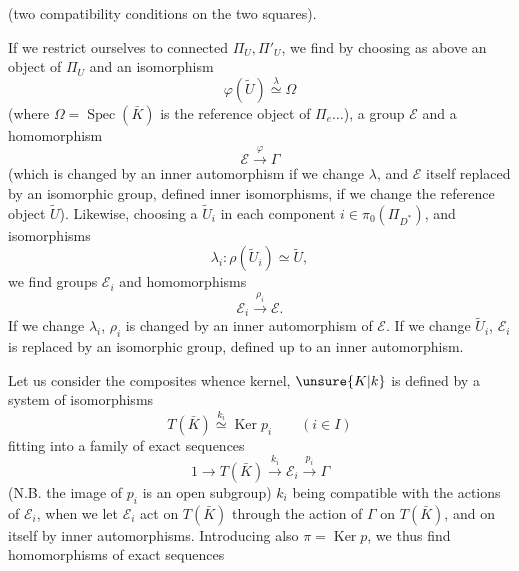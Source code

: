 
 (two compatibility conditions on the two squares).

If we  restrict ourselves to connected $\Pi_U,\Pi'_U$, we find by choosing as above an object  of $\Pi_U$ and an isomorphism
\[
\boxed{\varphi(\widetilde U)\overset{\lambda}{\simeq}\Omega}
\]
(where $\Omega=\operatorname{Spec}(\bar K)$ is the reference object of $\Pi_e\ldots$), a group $\mathcal E$ and a homomorphism
\[
\mathcal E\xrightarrow{\varphi}\Gamma
\]
(which is changed by an inner automorphism if we change $\lambda$, and $\mathcal E$ itself replaced by an isomorphic group,  defined  inner isomorphisms, if we change the reference object $\widetilde U$). Likewise, choosing a $\widetilde U_i$ in each component $i\in\pi_0(\Pi_{D^*})$, and isomorphisms
\[
\lambda_i:\rho(\widetilde U_i)\simeq\widetilde U,
\]
we find groups $\mathcal E_i$ and homomorphisms
\[
\mathcal E_i\xrightarrow{\rho_i}\mathcal E.
\]
If we change $\lambda_i$, $\rho_i$ is changed by an inner automorphism of $\mathcal E$. If we change $\widetilde U_i$, $\mathcal E_i$ is replaced by an isomorphic group,  defined up to an inner automorphism.


Let us consider the composites
whence kernel,  $\unsure{K|k}$ is defined by a system of isomorphisms
\[
T(\bar K)\overset{k_i}{\simeq}\operatorname{Ker}p_i\qquad(i\in I)
\]
fitting into a family of exact sequences
\[
1\longrightarrow T(\bar K)\xrightarrow{k_i}\mathcal E_i\xrightarrow{p_i}\Gamma
\]
(N.B. the image of $p_i$ is an open subgroup)
$k_i$ being compatible with the actions of $\mathcal E_i$, when we let $\mathcal E_i$ act on $T(\bar K)$ through the action of $\Gamma$ on $T(\bar K)$, and on itself by inner automorphisms. Introducing also $\pi=\operatorname{Ker}p$, we thus find homomorphisms of exact sequences

